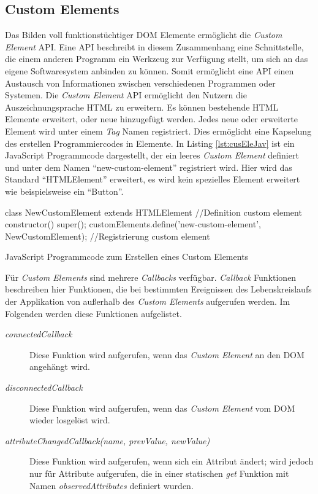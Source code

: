 \documentclass[12pt, paper=a4, bibtotoc, toc=listof, headsepline=true, numbers=endperiod]{scrreprt}
\begin{document}
		\subsection{Custom Elements}
		Das Bilden voll funktionstüchtiger \ac{DOM} Elemente ermöglicht die \emph{Custom Element} \ac{API}\cite{Denicola2016}. Eine \ac{API} beschreibt in diesem Zusammenhang eine Schnittstelle, die einem anderen Programm ein Werkzeug zur Verfügung stellt, um sich an das eigene Softwaresystem anbinden zu können\cite{Behrendt2016}. Somit ermöglicht eine \ac{API} einen Austausch von Informationen zwischen verschiedenen Programmen oder Systemen.	
		Die \emph{Custom Element} \ac{API} ermöglicht den Nutzern die Auszeichnungsprache \ac{HTML} zu erweitern\cite{Argelius2016}. Es können bestehende \ac{HTML} Elemente erweitert, oder neue hinzugefügt werden. Jedes neue oder erweiterte Element wird unter einem \emph{Tag} Namen registriert. Dies ermöglicht eine Kapselung des erstellen Programmiercodes in Elemente. In Listing \ref{lst:cusEleJav} ist ein JavaScript Programmcode dargestellt, der ein leeres \emph{Custom Element} definiert und unter dem Namen \enquote{new-custom-element} registriert wird. Hier wird das Standard \enquote{HTMLElement} erweitert, es wird kein spezielles Element erweitert wie beispielsweise ein \enquote{Button}.
		\begin{listing}
			\begin{JavaScriptcode*}{}
class NewCustomElement extends HTMLElement { //Definition custom element
	constructor() {
		super();
	}
}
customElements.define('new-custom-element', NewCustomElement); //Registrierung custom element
			\end{JavaScriptcode*}
			\caption[Erstellung Custom Element]{JavaScript Programmcode zum Erstellen eines Custom Elements}
			\label{lst:cusEleJav}
		\end{listing}
		Für \emph{Custom Elements} sind mehrere \emph{Callbacks} verfügbar. \emph{Callback} Funktionen beschreiben hier Funktionen, die bei bestimmten Ereignissen des Lebenskreislaufs der Applikation von außerhalb des \emph{Custom Elements} aufgerufen werden. Im Folgenden werden diese Funktionen aufgelistet\cite{Argelius2016}.
		\begin{description}  
			\item  [\emph{connectedCallback}] Diese Funktion wird aufgerufen, wenn das \emph{Custom Element} an den \ac{DOM} angehängt wird.			
			\item [\emph{disconnectedCallback}] Diese Funktion wird aufgerufen, wenn das \emph{Custom Element} vom \ac{DOM} wieder losgelöst wird. 			
			\item  [\emph{attributeChangedCallback(name, prevValue, newValue)}] Diese Funktion wird aufgerufen, wenn sich ein Attribut ändert; wird jedoch nur für Attribute aufgerufen, die in einer statischen \emph{get} Funktion mit Namen \emph{observedAttributes} definiert wurden.
		\end{description}
\end{document}
